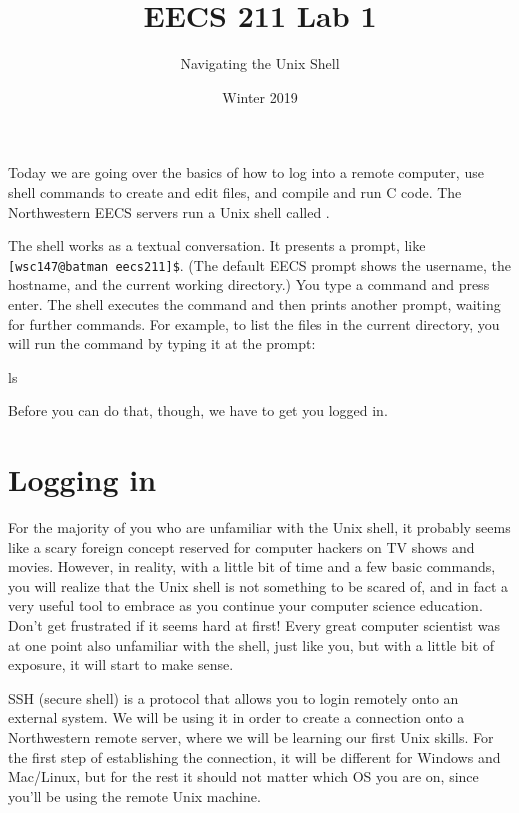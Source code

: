 \documentclass{tufte-handout}
\title{EECS 211 Lab 1}
\author{Navigating the Unix Shell}
\date{Winter 2019}
\begin{document}
\maketitle

Today we are going over the basics of how to log into a remote computer,
use shell commands to create and edit files, and compile and run C
code. The Northwestern EECS servers run a Unix shell called
.

The shell works as a textual conversation. It presents a prompt, like
\verb![wsc147@batman eecs211]$!. (The default EECS prompt shows the
username, the hostname, and the current working directory.) You type a
command and press enter. The shell executes the command and then prints
another prompt, waiting for further commands. For example, to list the
files in the current directory, you will run the  command
by typing it at the prompt:

\begin{CmdLine}
  \prompt ls
\end{CmdLine}


\noindent
Before you can do that, though, we have to get you logged in.

\section{Logging in}

For the majority of you who are unfamiliar with the Unix shell, it
probably seems like a scary foreign concept reserved for computer
hackers on TV shows and movies.  However, in reality, with a little bit
of time and a few basic commands, you will realize that the Unix shell
is not something to be scared of, and in fact a very useful tool to
embrace as you continue your computer science education. Don't get
frustrated if it seems hard at first! Every great computer scientist was
at one point also unfamiliar with the shell, just like you, but with a
little bit of exposure, it will start to make sense.

SSH (secure shell) is a protocol that allows you to login remotely onto
an external system. We will be using it in order to create a connection
onto a Northwestern remote server, where we will be learning our first
Unix skills. For the first step of establishing the connection, it will
be different for Windows and Mac/Linux, but for the rest it should not
matter which OS you are on, since you'll be using the remote Unix
machine.
\end{document}

